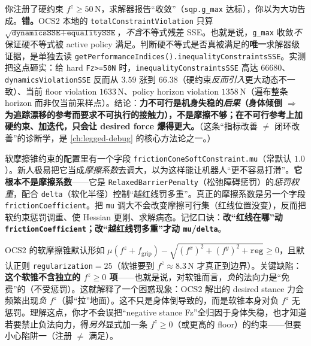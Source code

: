 \begin{pitfall}\label{pit:lb-register-ne-satisfy}
你注册了硬约束 $f^z\ge 50\,\mathrm{N}$，求解器报告“收敛”（\texttt{sqp.g\_max} 达标），你以为大功告成。\textbf{错。}OCS2 本地的 \texttt{totalConstraintViolation} 只算 $\sqrt{\texttt{dynamicsSSE}+\texttt{equalitySSE}}$，\emph{不含}不等式残差 SSE。也就是说，\texttt{g\_max} 收敛\emph{不}保证硬不等式被 active policy 满足。判断硬不等式是否真被满足的\textbf{唯一}求解器级证据，是单独去读 \texttt{getPerformanceIndices().inequalityConstraintsSSE}。实测把这点砸实：给 hard \texttt{Fz>=50N} 时，\texttt{inequalityConstraintsSSE} 高达 $66680$、\texttt{dynamicsViolationSSE} 反而从 $3.59$ 涨到 $66.38$（硬约束\emph{反而引入}更大动态不一致）、当前 floor violation $1633\,\mathrm{N}$、policy horizon violation $1358\,\mathrm{N}$（遍布整条 horizon 而非仅当前采样点）。结论：\textbf{力不可行是机身失稳的\emph{后果}（身体倾倒 $\Rightarrow$ 为追踪漂移的参考而要求不可执行的接触力），不是摩擦不够；在不可行参考上加硬约束、加迭代，只会让 desired force 爆得更大。}（这条“指标改善 $\ne$ 闭环改善”的诊断学，是 \cref{ch:legged-debug} 的核心方法论之一。）
\end{pitfall}

\begin{pitfall}\label{pit:lb-mu-naming}
软摩擦锥约束的配置里有一个字段 \texttt{frictionConeSoftConstraint.mu}（常默认 $1.0$）。新人极易把它当成\emph{摩擦系数}去调大，以为这样能让机器人“更不容易打滑”。\textbf{它根本不是摩擦系数}——它是 \texttt{RelaxedBarrierPenalty}（松弛障碍惩罚）的\emph{惩罚权重}，配合 \texttt{delta}（软化半径）控制“越红线罚多重”。真正的摩擦系数是另一个字段 \texttt{frictionCoefficient}。把 \texttt{mu} 调大不会改变摩擦可行集（红线位置没变），反而把软约束惩罚调重、使 Hessian 更刚、求解病态。记忆口诀：\textbf{改“红线在哪”动 \texttt{frictionCoefficient}；改“越红线罚多重”才动 \texttt{mu}/\texttt{delta}}。
\end{pitfall}

\begin{pitfall}\label{pit:lb-soft-cone-free}
OCS2 的软摩擦锥默认形如 $\mu(f^z+f_{\mathrm{grip}})-\sqrt{(f^x)^2+(f^y)^2+\texttt{reg}}\ge 0$，且默认正则 \texttt{regularization}$=25$（软锥要到 $f^z\approx 8.3\,\mathrm{N}$ 才真正到边界）。关键缺陷：\textbf{这个软锥不含独立的 $f^z\ge 0$ 项}——也就是说，对软锥而言，\emph{负}的法向力是“免费”的（不受惩罚）。这就解释了一个困惑现象：OCS2 解出的 desired stance 力会频繁出现\emph{负} $f^z$（脚“拉”地面）。这不只是身体倒导致的，而是软锥本身对负 $f^z$ 无惩罚。理解这点，你才不会误把“negative stance Fz”全归因于身体失稳，也才知道若要禁止负法向力，得\emph{另外}显式加一条 $f^z\ge 0$（或更高的 floor）的约束——但要小心陷阱一（注册 $\ne$ 满足）。
\end{pitfall}

